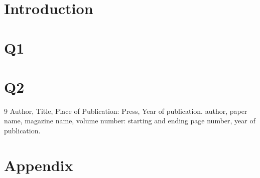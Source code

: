 \documentclass{apmcmthesis}
\begin{document}
\pagestyle{frontmatterstyle}

\begin{abstract} 
    
This is abstract of this thesis

\end{abstract}



\newpage
\tableofcontents


\newpage
\pagestyle{mainmatterstyle}
\setcounter{page}{1}

\section{Introduction}




\section{Q1}




\section{Q2}




\begin{thebibliography}{9}%
 Author, Title, Place of Publication: Press, Year of publication.
 author, paper name, magazine name, volume number: starting and ending
page number, year of publication.
\end{thebibliography}

\newpage

\section{Appendix}
\end{document}
